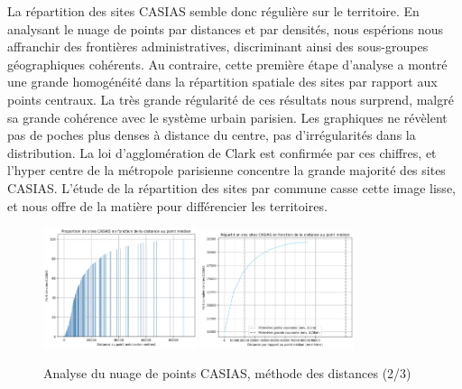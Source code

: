 \documentclass[a4paper,twoside,12pt]{book}
\begin{document}
La répartition des sites CASIAS semble donc régulière sur le territoire. En analysant le nuage de points par distances et par densités, nous espérions nous affranchir des frontières administratives, discriminant ainsi des sous-groupes géographiques cohérents. Au contraire, cette première étape d'analyse a montré une grande homogénéité dans la répartition spatiale des sites par rapport aux points centraux. La très grande régularité de ces résultats nous surprend, malgré sa grande cohérence avec le système urbain parisien. Les graphiques ne révèlent pas de poches plus denses à distance du centre, pas d'irrégularités dans la distribution. La loi d'agglomération de Clark est confirmée par ces chiffres, et l'hyper centre de la métropole parisienne concentre la grande majorité des sites CASIAS. L'étude de la répartition des sites par commune casse cette image lisse, et nous offre de la matière pour différencier les territoires. 


 \begin{figure}[!h] 
\centering  
\includegraphics[width=0.4\textwidth]{img/chapitre3/Distribution_Proportion_CASIAS_Point_Median.png} 
\includegraphics[width=0.4\textwidth]{img/chapitre3/CASIAS_Courbe_Cumulative_Distances_Point_Median.png} 
\caption{Analyse du nuage de points CASIAS, méthode des distances (2/3)} 
\label{fig:casias_parts_cumulées} 
\end{figure}
\end{document}
